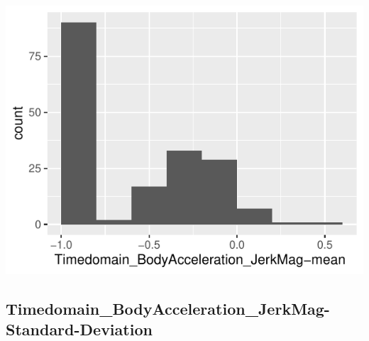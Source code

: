 \documentclass[
]{article}
\begin{document}
\begin{minipage}{0.25 \textwidth}

\includegraphics{codebook_tidydatasub_files/figure-latex/Var-37-Timedomain-BodyAcceleration-JerkMag-mean--1.pdf}

\end{minipage}

\noindent\makebox[\linewidth]{\rule{\textwidth}{0.4pt}}

\hypertarget{timedomain_bodyacceleration_jerkmag-standard-deviation}{%
\subsection{Timedomain\_BodyAcceleration\_JerkMag-Standard-Deviation}\label{timedomain_bodyacceleration_jerkmag-standard-deviation}}
\end{document}
